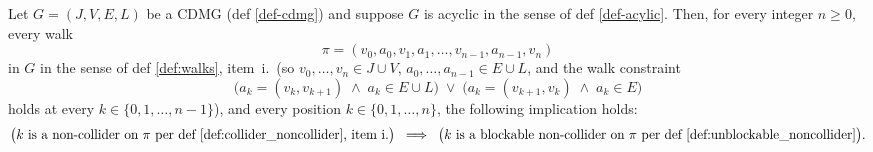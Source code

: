 \documentclass[main]{subfiles}
\begin{document}
\def\rowref{claim\_3\_20}
\label{claim_3_20}

\begin{Rem}[AcyclicNonCollidersBlockable]
    Let $G = (J, V, E, L)$ be a CDMG (def \ref{def-cdmg}) and suppose $G$ is acyclic in the sense of def \ref{def-acylic}. Then, for every integer $n \ge 0$, every walk
    \[
        \pi = (v_0, a_0, v_1, a_1, \dots, v_{n-1}, a_{n-1}, v_n)
    \]
    in $G$ in the sense of def \ref{def:walks}, item~i.\ (so $v_0, \dots, v_n \in J \cup V$, $a_0, \dots, a_{n-1} \in E \cup L$, and the walk constraint
    \[
        \bigl(a_k = (v_k, v_{k+1}) \;\land\; a_k \in E \cup L\bigr)
        \;\lor\;
        \bigl(a_k = (v_{k+1}, v_k) \;\land\; a_k \in E\bigr)
    \]
    holds at every $k \in \{0, 1, \dots, n - 1\}$), and every position $k \in \{0, 1, \dots, n\}$, the following implication holds:
    \[
        \bigl(\text{$k$ is a non-collider on $\pi$ per def \ref{def:collider_noncollider}, item~i.}\bigr)
        \;\implies\;
        \bigl(\text{$k$ is a blockable non-collider on $\pi$ per def \ref{def:unblockable_noncollider}}\bigr).
    \]
\end{Rem}
\end{document}
